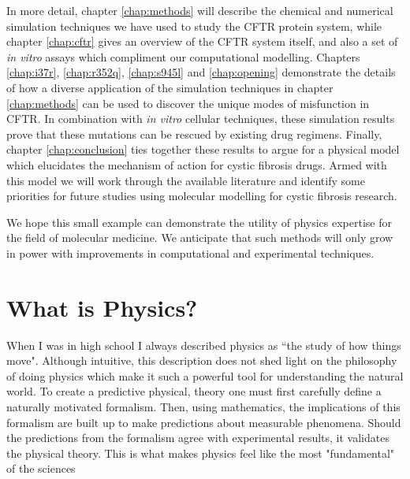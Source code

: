 In more detail, chapter \ref{chap:methods} will describe the chemical and numerical simulation techniques we have used to study the CFTR protein system, while chapter \ref{chap:cftr} gives an overview of the CFTR system itself, and also a set of \textit {in vitro} assays which compliment our computational modelling.  Chapters \ref{chap:i37r}, \ref{chap:r352q}, \ref{chap:s945l} and \ref{chap:opening} demonstrate the details of how a diverse application of the simulation techniques in chapter \ref{chap:methods} can be used to discover the unique modes of misfunction in CFTR. In combination with \textit {in vitro} cellular techniques, these simulation results prove that these mutations can be rescued by existing drug regimens. Finally, chapter \ref{chap:conclusion} ties together these results to argue for a physical model which elucidates the mechanism of action for cystic fibrosis drugs. Armed with this model we will work through the available literature and identify some priorities for future studies using molecular modelling for cystic fibrosis research.

We hope this small example can demonstrate the utility of physics expertise for the field of molecular medicine. We anticipate that such methods will only grow in power with improvements in computational and experimental techniques.

\section{What is Physics?}
When I was in high school I always described physics as ``the study of how things move". Although intuitive, this description does not shed light on the philosophy of doing physics which make it such a powerful tool for understanding the natural world. To create a predictive physical, theory one must first carefully define a naturally motivated formalism. Then, using mathematics, the implications of this formalism are built up to make predictions about measurable phenomena. Should the predictions from the formalism agree with experimental results, it validates the physical theory. This is what makes physics feel like the most "fundamental" of the sciences

